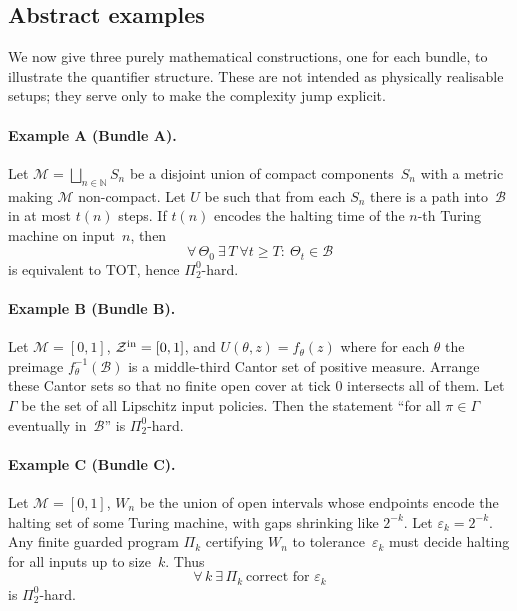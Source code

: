 \documentclass[12pt]{article}
\theoremstyle{definition}
\theoremstyle{plain}
\begin{document}
\subsection{Abstract examples}

We now give three purely mathematical constructions, 
one for each bundle, to illustrate the quantifier structure. 
These are not intended as physically realisable setups; 
they serve only to make the complexity jump explicit.

\paragraph{Example A (Bundle A).}
Let \(\mathcal{M} = \bigsqcup_{n\in\mathbb{N}} S_n\) 
be a disjoint union of compact components~\(S_n\) 
with a metric making \(\mathcal{M}\) non-compact. 
Let \(U\) be such that from each \(S_n\) there is a path into~\(\mathcal{B}\) 
in at most \(t(n)\) steps. 
If \(t(n)\) encodes the halting time of the \(n\)-th Turing machine on input~\(n\), 
then
\[
\forall\,\Theta_0\ \exists\, T\ \forall t\ge T:\ \Theta_t\in\mathcal{B}
\]
is equivalent to \(\mathrm{TOT}\), hence \(\Pi^0_2\)-hard.

\paragraph{Example B (Bundle B).}
Let \(\mathcal{M}=[0,1]\), \(\mathcal{Z}^{\rm in}=[0,1]\), 
and \(U(\theta,z) = f_\theta(z)\) where for each \(\theta\) 
the preimage \(f_\theta^{-1}(\mathcal{B})\) 
is a middle-third Cantor set of positive measure. 
Arrange these Cantor sets so that no finite open cover at tick 0 
intersects all of them. 
Let \(\Gamma\) be the set of all Lipschitz input policies. 
Then the statement 
``for all \(\pi\in\Gamma\) eventually in~\(\mathcal{B}\)'' 
is \(\Pi^0_2\)-hard.

\paragraph{Example C (Bundle C).}
Let \(\mathcal{M}=[0,1]\), \(W_n\) be the union of open intervals 
whose endpoints encode the halting set of some Turing machine, 
with gaps shrinking like \(2^{-k}\). 
Let \(\varepsilon_k=2^{-k}\). 
Any finite guarded program \(\Pi_k\) certifying \(W_n\) 
to tolerance~\(\varepsilon_k\) must decide 
halting for all inputs up to size~\(k\). 
Thus 
\[
\forall\, k\ \exists\, \Pi_k\ \text{correct for $\varepsilon_k$}
\]
is \(\Pi^0_2\)-hard.
\end{document}

